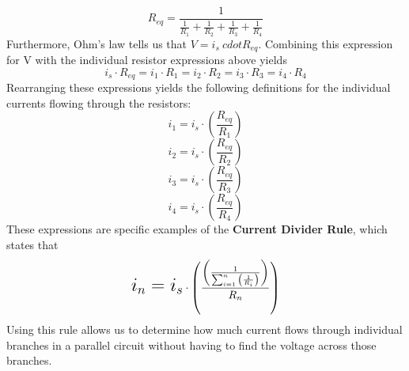 $$
R_{eq} = \frac{1}{\frac{1}{R_1} + \frac{1}{R_2} + \frac{1}{R_3} + \frac{1}{R_4}}
$$
Furthermore, Ohm's law tells us that  $V=i_s \ cdot R_{eq}$. Combining this expression for V with the individual resistor expressions above yields
$$
i_s \cdot R_{eq} =  i_1 \cdot R_1 = i_2 \cdot R_2 = i_3 \cdot R_3 = i_4 \cdot R_4
$$
Rearranging these expressions yields the following definitions for the individual currents flowing through the resistors:
$$
i_1 = i_s \cdot \left(\frac{R_{eq}}{R_1}\right)
$$
$$
i_2 = i_s \cdot \left(\frac{R_{eq}}{R_2}\right)
$$
$$
i_3 = i_s \cdot \left(\frac{R_{eq}}{R_3}\right)
$$
$$
i_4 = i_s \cdot \left(\frac{R_{eq}}{R_4}\right)
$$
These expressions are specific examples of the \textbf{Current Divider Rule}, which states that
$$
\mathlarger{\mathlarger{\mathlarger{i_n = i_s}}} \cdot \left(\frac{\left(\frac{1}{\sum_{i=1}^n{\left(\frac{1}{R_i}\right)}}\right)}{R_n}\right)
$$
Using this rule allows us to determine how much current flows through individual branches in a parallel circuit without having to find the voltage across those branches.
